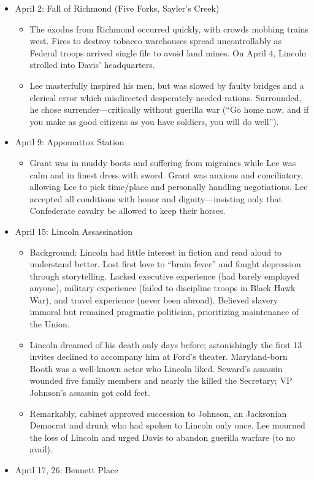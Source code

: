 \documentclass[
]{article}
\providecommand{\tightlist}{%
  \setlength{\itemsep}{0pt}\setlength{\parskip}{0pt}}
\begin{document}
\begin{itemize}
\item
  April 2: Fall of Richmond (Five Forks, Sayler's Creek)

  \begin{itemize}
  \item
    The exodus from Richmond occurred quickly, with crowds mobbing
    trains west. Fires to destroy tobacco warehouses spread
    uncontrollably as Federal troops arrived single file to avoid land
    mines. On April 4, Lincoln strolled into Davis' headquarters.
  \item
    Lee masterfully inspired his men, but was slowed by faulty bridges
    and a clerical error which misdirected desperately-needed rations.
    Surrounded, he chose surrender---critically without guerilla war
    (``Go home now, and if you make as good citizens as you have
    soldiers, you will do well'').
  \end{itemize}
\item
  April 9: Appomattox Station

  \begin{itemize}
  \tightlist
  \item
    Grant was in muddy boots and suffering from migraines while Lee was
    calm and in finest dress with sword. Grant was anxious and
    conciliatory, allowing Lee to pick time/place and personally
    handling negotiations. Lee accepted all conditions with honor and
    dignity---insisting only that Confederate cavalry be allowed to keep
    their horses.
  \end{itemize}
\item
  April 15: Lincoln Assassination

  \begin{itemize}
  \item
    Background: Lincoln had little interest in fiction and read aloud to
    understand better. Lost first love to ``brain fever'' and fought
    depression through storytelling. Lacked executive experience (had
    barely employed anyone), military experience (failed to discipline
    troops in Black Hawk War), and travel experience (never been
    abroad). Believed slavery immoral but remained pragmatic politician,
    prioritizing maintenance of the Union.
  \item
    Lincoln dreamed of his death only days before; astonishingly the
    first 13 invites declined to accompany him at Ford's theater.
    Maryland-born Booth was a well-known actor who Lincoln liked.
    Seward's assassin wounded five family members and nearly the killed
    the Secretary; VP Johnson's assassin got cold feet.
  \item
    Remarkably, cabinet approved succession to Johnson, an Jacksonian
    Democrat and drunk who had spoken to Lincoln only once. Lee mourned
    the loss of Lincoln and urged Davis to abandon guerilla warfare (to
    no avail).
  \end{itemize}
\item
  April 17, 26: Bennett Place


\end{itemize}
\end{document}
